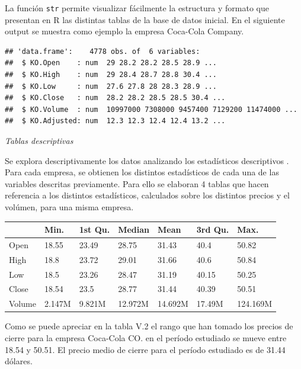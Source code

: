 \documentclass[]{DissertateUSU}
\begin{document}
\noindent La función \texttt{str} permite visualizar fácilmente la
estructura y formato que presentan en R las distintas tablas de la base
de datos inicial. En el siguiente output se muestra como ejemplo la
empresa Coca-Cola Company.

\centering

\begin{verbatim}
## 'data.frame':    4778 obs. of  6 variables:
##  $ KO.Open    : num  29 28.2 28.2 28.5 28.9 ...
##  $ KO.High    : num  29 28.4 28.7 28.8 30.4 ...
##  $ KO.Low     : num  27.6 27.8 28 28.3 28.9 ...
##  $ KO.Close   : num  28.2 28.2 28.5 28.5 30.4 ...
##  $ KO.Volume  : num  10997000 7308000 9457400 7129200 11474000 ...
##  $ KO.Adjusted: num  12.3 12.3 12.4 12.4 13.2 ...
\end{verbatim}

\setlength\parskip{5ex}
\justifying

\emph{Tablas descriptivas}

\noindent Se explora descriptivamente los datos analizando los
estadísticos descriptivos . Para cada empresa, se obtienen los distintos
estadísticos de cada una de las variables descritas previamente. Para
ello se elaboran 4 tablas que hacen referencia a los distintos
estadísticos, calculados sobre los distintos precios y el volúmen, para
una misma empresa.

\begin{table}[H]
\centering\begingroup\fontsize{10}{12}\selectfont

\begin{tabular}{l|l|l|l|l|l|l}
\hline
  & Min. & 1st Qu. & Median & Mean & 3rd Qu. & Max.\\
\hline
Open & 18.55 & 23.49 & 28.75 & 31.43 & 40.4 & 50.82\\
\hline
High & 18.8 & 23.72 & 29.01 & 31.66 & 40.6 & 50.84\\
\hline
Low & 18.5 & 23.26 & 28.47 & 31.19 & 40.15 & 50.25\\
\hline
Close & 18.54 & 23.5 & 28.77 & 31.44 & 40.39 & 50.51\\
\hline
Volume & 2.147M & 9.821M & 12.972M & 14.692M & 17.49M & 124.169M\\
\hline
\end{tabular}
\endgroup{}
\end{table}

\setlength\parskip{5ex}
\justifying

\noindent Como se puede apreciar en la tabla V.2 el rango que han tomado
los precios de cierre para la empresa Coca-Cola CO. en el período
estudiado se mueve entre 18.54 y 50.51. El precio medio de cierre para
el período estudiado es de 31.44 dólares.
\end{document}
